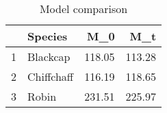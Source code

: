 \begin{table}[ht]
\centering
\begin{tabular}{rlrr}
  \hline
 & Species & M\_0 & M\_t \\ 
  \hline
1 & Blackcap & 118.05 & 113.28 \\ 
  2 & Chiffchaff & 116.19 & 118.65 \\ 
  3 & Robin & 231.51 & 225.97 \\ 
   \hline
\end{tabular}
\caption{Model comparison} 
\label{tab:model_comparison}
\end{table}
